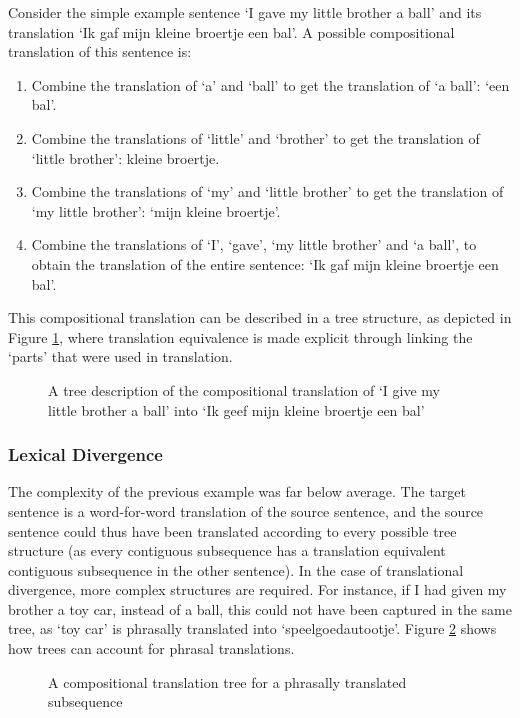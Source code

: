 Consider the simple example sentence `I gave my little brother a ball' and its translation `Ik gaf mijn kleine broertje een bal'. A possible compositional translation of this sentence is:\begin{enumerate}
\item Combine the translation of `a' and `ball' to get the translation of `a ball': `een bal'.
\item Combine the translations of `little' and `brother' to get the translation of `little brother': kleine broertje.
\item Combine the translations of `my' and `little brother' to get the translation of `my little brother': `mijn kleine broertje'.
\item Combine the translations of `I', `gave', `my little brother' and `a ball', to obtain the translation of the entire sentence: `Ik gaf mijn kleine broertje een bal'.
\end{enumerate}

This compositional translation can be described in a tree structure, as depicted in Figure \ref{fig:transtrees}, where translation equivalence is made explicit through linking the `parts' that were used in translation.

\begin{figure}[!ht]

\caption{A tree description of the compositional translation of `I give my little brother a ball' into `Ik geef mijn kleine broertje een bal'}\label{fig:transtrees}
\end{figure}

\subsubsection{Lexical Divergence}

The complexity of the previous example was far below average. The target sentence is a word-for-word translation of the source sentence, and the source sentence could thus have been translated according to every possible tree structure (as every contiguous subsequence has a translation equivalent contiguous subsequence in the other sentence). In the case of translational divergence, more complex structures are required. For instance, if I had given my brother a toy car, instead of a ball, this could not have been captured in the same tree, as `toy car' is phrasally translated into `speelgoedautootje'. Figure \ref{fig:phrasal} shows how trees can account for phrasal translations.

\begin{figure}[!ht]
\centering

\caption{A compositional translation tree for a phrasally translated subsequence}\label{fig:phrasal}
\end{figure}

